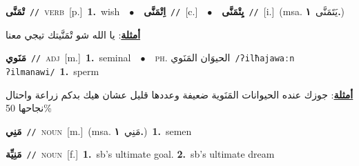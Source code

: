 \documentclass[10pt,a4paper,twoside]{article} %
\begin{document}
\begin{multicols}{2}
{\setlength\topsep{0pt}\textbf{\foreignlanguage{arabic}{تْمَنَّى}}\ {\color{gray}\texttt{//}\color{black}}\ \textsc{verb}\ [p.]\ \textbf{1.}~wish\ \ $\bullet$\ \ \setlength\topsep{0pt}\textbf{\foreignlanguage{arabic}{اِتْمَنَّى}}\ {\color{gray}\texttt{//}\color{black}}\ [c.]\ \ $\bullet$\ \ \setlength\topsep{0pt}\textbf{\foreignlanguage{arabic}{يِتْمَنَّى}}\ {\color{gray}\texttt{//}\color{black}}\ [i.]\ \color{gray}(msa. \foreignlanguage{arabic}{يَتَمَنَّى}~\foreignlanguage{arabic}{\textbf{١.}})\color{black}\  \begin{flushright}\color{gray}\foreignlanguage{arabic}{\textbf{\underline{\foreignlanguage{arabic}{أمثلة}}}: يا الله شو تْمَنَّيتك تيجي معنا}\end{flushright}\color{black}} \vspace{2mm}

{\setlength\topsep{0pt}\textbf{\foreignlanguage{arabic}{مَنَوي}}\ {\color{gray}\texttt{//}\color{black}}\ \textsc{adj}\ [m.]\ \textbf{1.}~seminal\ \ $\bullet$\ \ \textsc{ph.} \color{gray} \foreignlanguage{arabic}{الحيوَان المَنَوي}\color{black}\ {\color{gray}\texttt{/{\sffamily ʔilħajawaːn ʔilmanawi}/}\color{black}}\ \textbf{1.}~sperm\  \begin{flushright}\color{gray}\foreignlanguage{arabic}{\textbf{\underline{\foreignlanguage{arabic}{أمثلة}}}: جوزك عنده الحيوانات المَنَوية ضعيفة وعددها قليل عشان هيك بدكم زراعة واحتال نجاحها 50\%}\end{flushright}\color{black}} \vspace{2mm}

{\setlength\topsep{0pt}\textbf{\foreignlanguage{arabic}{مَنِي}}\ {\color{gray}\texttt{//}\color{black}}\ \textsc{noun}\ [m.]\ \color{gray}(msa. \foreignlanguage{arabic}{مَنِي}~\foreignlanguage{arabic}{\textbf{١.}})\color{black}\ \textbf{1.}~semen\ } \vspace{2mm}

{\setlength\topsep{0pt}\textbf{\foreignlanguage{arabic}{مَنِيِّة}}\ {\color{gray}\texttt{//}\color{black}}\ \textsc{noun}\ [f.]\ \textbf{1.}~sb's ultimate goal.  \textbf{2.}~sb's ultimate dream\ } \vspace{2mm}


\end{multicols}
\end{document}
